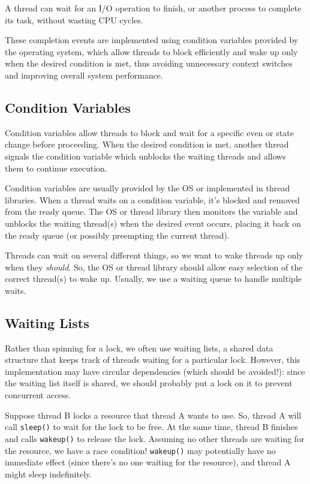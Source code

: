 \documentclass{report}
\newcommand{\exampleBegin}[1]{\begin{tcolorbox}[colback=blue!5!white,colframe=black!75!blue,title={Example:
      #1}]}
\newcommand{\exampleEnd}{\end{tcolorbox}}
\newcommand{\corollaryBegin}[1]{\begin{tcolorbox}[colback=teal!5!white,colframe=black!75!teal,title={Corollary:
      #1}]}
\newcommand{\corollaryEnd}{\end{tcolorbox}}
\begin{document}
\exampleBegin{What to Do?}
A thread can wait for an I/O operation to finish, or another process to complete its task, without
wasting CPU cycles. 
\exampleEnd

These completion events are implemented using condition variables provided by
the operating system, which allow threads to block efficiently and wake up only when the desired
condition is met, thus avoiding unnecessary context switches and improving overall system performance.


\subsection{Condition Variables}
Condition variables allow threads to block and wait for a specific even or state change before
proceeding. When the desired condition is met, another thread signals the condition variable which
unblocks the waiting threads and allows them to continue execution.

Condition variables are usually provided by the OS or implemented in thread libraries. When a thread
waits on a condition variable, it's blocked and removed from the ready queue. The OS or thread
library then monitors the variable and unblocks the waiting thread(s) when the desired event occurs,
placing it back on the ready queue (or possibly preempting the current thread). 


\corollaryBegin{Multiple Waits}
Threads can wait on several different things, so we want to wake threads up only when they
\textit{should}. So, the OS or thread library should allow easy selection of the correct thread(s)
to wake up. Usually, we use a waiting queue to handle multiple waits.
\corollaryEnd


\subsection{Waiting Lists}
Rather than spinning for a lock, we often use waiting lists, a shared data structure that keeps
track of threads waiting for a particular lock. However, this implementation may have circular
dependencies (which should be avoided!): since the waiting list itself is shared, we should probably
put a lock on it to prevent concurrent access.

\exampleBegin{Sleeping Beauty}
Suppose thread B locks a resource that thread A wants to use. So, thread A will call \texttt{sleep()} to
wait for the lock to be free. At the same time, thread B finishes and calls \texttt{wakeup()} to
release the lock. Assuming no other threads are waiting for the resource, we have a race condition!
\texttt{wakeup()} may potentially have no immediate effect (since there's no one waiting for the
resource), and thread A might sleep indefinitely.
\exampleEnd
\end{document}
